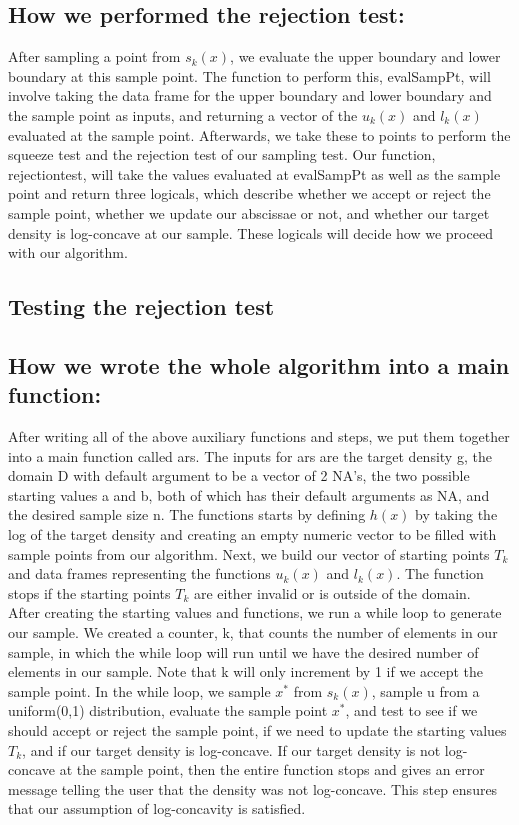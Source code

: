 \documentclass[12pt]{article}
\begin{document}
\subsection*{How we performed the rejection test:}

After sampling a point from $s_k(x)$, we evaluate the upper boundary and lower boundary at this sample point.  The function to perform this, evalSampPt, will involve taking  the data frame for the upper boundary and lower boundary and the sample point as inputs, and returning a vector of the $u_k(x)$ and $l_k(x)$ evaluated at the sample point.  Afterwards, we take these to points to perform the squeeze test and the rejection test of our sampling test.  Our function, rejectiontest, will take the values evaluated at evalSampPt as well as the sample point and return three logicals, which describe whether we accept or reject the sample point, whether we update our abscissae or not, and whether our target density is log-concave at our sample.  These logicals will decide how we proceed with our algorithm.  

\subsection*{Testing the rejection test}



\subsection*{How we wrote the whole algorithm into a main function:}
After writing all of the above auxiliary functions and steps, we put them together into a main function called ars.  The inputs for ars are the target density g, the domain D with default argument to be a vector of 2 NA's, the two possible starting values a and b, both of which has their default arguments as NA, and the desired sample size n.  The functions starts by defining $h(x)$ by taking the log of the target density and creating an empty numeric vector to be filled with sample points from our algorithm.  Next, we build our vector of starting points $T_k$ and data frames representing the functions $u_k(x)$ and $l_k(x)$.  The function stops if the starting points $T_k$ are either invalid or is outside of the domain.  \\

After creating the starting values and functions, we run a while loop to generate our sample.  We created a counter, k, that counts the number of elements in our sample, in which the while loop will run until we have the desired number of elements in our sample. Note that k will only increment by 1 if we accept the sample point.  In the while loop, we sample $x^*$ from $s_k(x)$, sample u from a uniform(0,1) distribution, evaluate the sample point $x^*$, and test to see if we should accept or reject the sample point, if we need to update the starting values $T_k$, and if our target density is log-concave.  If our target density is not log-concave at the sample point, then the entire function stops and gives an error message telling the user that the density was not log-concave.  This step ensures that our assumption of log-concavity is satisfied.\\
\end{document}
